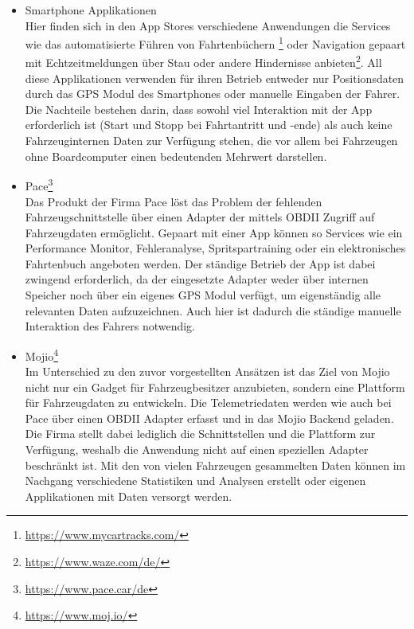\begin{itemize}
\item Smartphone Applikationen \\
Hier finden sich in den App Stores verschiedene Anwendungen die Services wie das automatisierte Führen von Fahrtenbüchern \footnote{\url{https://www.mycartracks.com/}} oder Navigation gepaart mit Echtzeitmeldungen über Stau oder andere Hindernisse anbieten\footnote{\url{https://www.waze.com/de/}}. All diese Applikationen verwenden für ihren Betrieb entweder nur Positionsdaten durch das \ac{GPS} Modul des Smartphones oder manuelle Eingaben der Fahrer. Die Nachteile bestehen darin, dass sowohl viel Interaktion mit der App erforderlich ist (Start und Stopp bei Fahrtantritt und -ende) als auch keine Fahrzeuginternen Daten zur Verfügung stehen, die vor allem bei Fahrzeugen ohne Boardcomputer einen bedeutenden Mehrwert darstellen.
\item Pace\footnote{\url{https://www.pace.car/de}}\\
Das Produkt der Firma Pace löst das Problem der fehlenden Fahrzeugschnittstelle über einen Adapter der mittels \ac{OBD}II Zugriff auf Fahrzeugdaten ermöglicht. Gepaart mit einer App können so Services wie ein Performance Monitor, Fehleranalyse, Spritspartraining oder ein elektronisches Fahrtenbuch angeboten werden. Der ständige Betrieb der App ist dabei zwingend erforderlich, da der eingesetzte Adapter weder über internen Speicher noch über ein eigenes GPS Modul verfügt, um eigenständig alle relevanten Daten aufzuzeichnen. Auch hier ist dadurch die ständige manuelle Interaktion des Fahrers notwendig.
\item Mojio\footnote{\url{https://www.moj.io/}}\\
Im Unterschied zu den zuvor vorgestellten Ansätzen ist das Ziel von Mojio nicht nur ein Gadget für Fahrzeugbesitzer anzubieten, sondern eine Plattform für Fahrzeugdaten zu entwickeln. Die Telemetriedaten werden wie auch bei Pace über einen OBDII Adapter erfasst und in das Mojio Backend geladen. Die Firma stellt dabei lediglich die Schnittstellen und die Plattform zur Verfügung, weshalb die Anwendung nicht auf einen speziellen Adapter beschränkt ist. Mit den von vielen Fahrzeugen gesammelten Daten können im Nachgang verschiedene Statistiken und Analysen erstellt oder eigenen Applikationen mit Daten versorgt werden.
\end{itemize}

